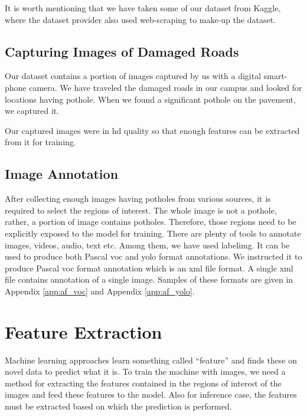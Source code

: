             It is worth mentioning that we have taken some of our dataset from Kaggle, where the dataset provider also used web-scraping to make-up the dataset.
            
        \subsection{Capturing Images of Damaged Roads}
            Our dataset contains a portion of images captured by us with a digital smart-phone camera. We have traveled the damaged roads in our campus and looked for locations having pothole. When we found a significant pothole on the pavement, we captured it.
            
            Our captured images were in \acrshort{hd} quality so that enough features can be extracted from it for training.
            
        \subsection{Image Annotation}
            After collecting enough images having potholes from various sources, it is required to select the regions of interest\cite{privitera2000algorithms}. The whole image is not a pothole, rather, a portion of image contains potholes. Therefore, those regions need to be explicitly exposed to the model for training. There are plenty of tools to annotate images, videos, audio, text etc. Among them, we have used \gls{labelimg}\cite{tzutalingit}. It can be used to produce both Pascal \acrfull{voc} and \acrfull{yolo} format annotations. We instructed it to produce Pascal \acrshort{voc} format annotation which is an \acrshort{xml} file format. A single \acrshort{xml} file contains annotation of a single image. Samples of these formats are given in Appendix \ref{app:af_voc} and Appendix \ref{app:af_yolo}.
            
    \section{Feature Extraction}
        Machine learning approaches learn something called ``feature'' and finds these on novel data to predict what it is\cite{kotsiantis2006machine}. To train the machine with images, we need a method for extracting the features contained in the regions of interest of the images and feed these features to the model. Also for inference case, the features must be extracted based on which the prediction is performed.
        
